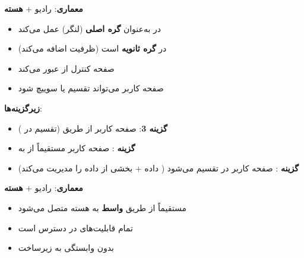 

\CNchained{}

\textbf{معماری}: رادیو  + \textbf{هسته }

\begin{itemize}
\tightlist
\item
   در  به‌عنوان \textbf{گره اصلی} (لنگر) عمل می‌کند
\item
   در  \textbf{گره ثانویه} است (ظرفیت اضافه می‌کند)
\item
  صفحه کنترل از  عبور می‌کند 
\item
  صفحه کاربر می‌تواند تقسیم یا سوییچ شود
\end{itemize}

\textbf{زیرگزینه‌ها}:

\begin{itemize}
\tightlist
\item
  \textbf{گزینه 3}: صفحه کاربر از طریق  (تقسیم در )
\item
  \textbf{گزینه }: صفحه کاربر مستقیماً از  به 
\item
  \textbf{گزینه }: صفحه کاربر در  تقسیم می‌شود ( داده  + بخشی از داده  را مدیریت می‌کند)
\end{itemize}


\textbf{معماری}: رادیو  + \textbf{هسته }

\begin{itemize}
\tightlist
\item
   مستقیماً از طریق \textbf{واسط } به هسته  متصل می‌شود
\item
  تمام قابلیت‌های  در دسترس است
\item
  بدون وابستگی به زیرساخت 
\end{itemize}


